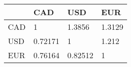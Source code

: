 \begin{tabular}{llll}
& CAD & USD & EUR \\ 
\hline 
CAD & 1 & 1.3856 & 1.3129 \\ 
USD & 0.72171 & 1 & 1.212 \\ 
EUR & 0.76164 & 0.82512 & 1 \\ 
\hline 
\end{tabular}